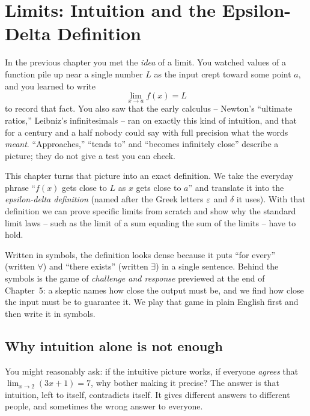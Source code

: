 \chapter{Limits: Intuition and the Epsilon-Delta Definition}

In the previous chapter you met the \emph{idea} of a limit. You watched values
of a function pile up near a single number $L$ as the input crept toward some
point $a$, and you learned to write
\[
  \lim_{x \to a} f(x) = L
\]
to record that fact. You also saw that the early calculus -- Newton's
``ultimate ratios,'' Leibniz's infinitesimals -- ran on exactly this kind of
intuition, and that for a century and a half nobody could say with full
precision what the words \emph{meant}. ``Approaches,'' ``tends to'' and
``becomes infinitely close'' describe a picture; they do not give a test you
can check.

This chapter turns that picture into an exact definition. We take the everyday
phrase ``$f(x)$ gets close to $L$ as $x$ gets close to $a$'' and translate it into
the \emph{epsilon-delta definition} (named after the Greek letters $\varepsilon$ and $\delta$ it uses). With that definition we can prove specific limits from scratch and show why the standard limit laws -- such as the limit of a sum equaling the sum of the limits -- have to hold.

Written in symbols, the definition looks dense because it puts ``for every'' (written $\forall$) and ``there exists'' (written $\exists$) in a single sentence. Behind the symbols is the game of \emph{challenge and response} previewed at the end of Chapter~5: a skeptic names how close the output must be, and we find how close the input must be to guarantee it. We play that game in plain English first and then write it in symbols.

\chapterline

\section{Why intuition alone is not enough}
\label{ch06:why-not-enough}

You might reasonably ask: if the intuitive picture works, if everyone
\emph{agrees} that $\lim_{x\to 2}(3x+1) = 7$, why bother making it precise? The
answer is that intuition, left to itself, contradicts itself. It gives
different answers to different people, and sometimes the wrong answer to
everyone.

